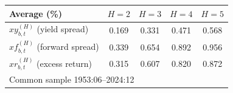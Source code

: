 \begin{tabular}{lcccc}
\toprule
Average (\%) & $H=2$ & $H=3$ & $H=4$ & $H=5$ \\
\midrule
$xy^{(H)}_{b,t}$ (yield spread) & 0.169 & 0.331 & 0.471 & 0.568 \\
$xf^{(H)}_{b,t}$ (forward spread) & 0.339 & 0.654 & 0.892 & 0.956 \\
$xr^{(H)}_{b,t}$ (excess return) & 0.315 & 0.607 & 0.820 & 0.872 \\
\midrule
\multicolumn{5}{l}{Common sample 1953:06--2024:12} \\
\bottomrule
\end{tabular}
